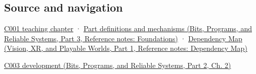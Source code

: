 \subsection{Source and navigation}\label{appendix-e4ccdbab8320-source-and-navigation}

\hypertarget{appendix-e4ccdbab8320-source-and-navigation}{}

\hyperref[01-foundations-i-ch001-from-a-signal-to-an-interpretation]{C001 teaching chapter} · \href{../01-Bits-Programs-and-Reliable-Systems-P03/main.pdf\#appendix-fd090d982a15}{Part definitions and mechanisms (Bits, Programs, and Reliable Systems, Part 3, Reference notes: Foundations)} · \href{../07-Vision-XR-and-Playable-Worlds-P01/main.pdf\#appendix-4ad47bdd269a}{Dependency Map (Vision, XR, and Playable Worlds, Part 1, Reference notes: Dependency Map)}

\href{../01-Bits-Programs-and-Reliable-Systems-P02/main.pdf\#01-foundations-i-ch002-where-the-bytes-live}{C003 development (Bits, Programs, and Reliable Systems, Part 2, Ch. 2)}
